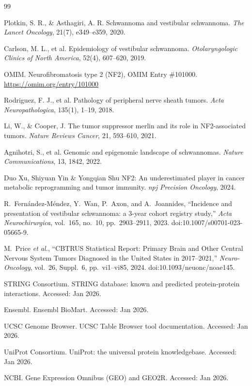 \documentclass[11pt]{article}
\begin{document}
	
	\begin{thebibliography}{99}
		
	Plotkin, S. R., \& Asthagiri, A. R.
	\newblock Schwannoma and vestibular schwannoma.
	\newblock \emph{The Lancet Oncology}, 21(7), e349--e359, 2020.
	
	Carlson, M. L., et al.
	\newblock Epidemiology of vestibular schwannoma.
	\newblock \emph{Otolaryngologic Clinics of North America}, 52(4), 607--620, 2019.
	
	OMIM.
	\newblock Neurofibromatosis type 2 (NF2), OMIM Entry \#101000.
	\newblock \url{https://omim.org/entry/101000}
	
	Rodriguez, F. J., et al.
	\newblock Pathology of peripheral nerve sheath tumors.
	\newblock \emph{Acta Neuropathologica}, 135(1), 1--19, 2018.
	
	Li, W., \& Cooper, J.
	\newblock The tumor suppressor merlin and its role in NF2-associated tumors.
	\newblock \emph{Nature Reviews Cancer}, 21, 593--610, 2021.
	
	Agnihotri, S., et al.
	\newblock Genomic and epigenomic landscape of schwannomas.
	\newblock \emph{Nature Communications}, 13, 1842, 2022.
	
	Duo Xu, Shiyuan Yin \& Yongqian Shu
	\newblock NF2: An underestimated player in cancer metabolic reprogramming and tumor immunity.
	\newblock \emph{npj Precision Oncology}, 2024.
	
	R.~Fernández-Méndez, Y.~Wan, P.~Axon, and A.~Joannides,
	``Incidence and presentation of vestibular schwannoma: a 3-year cohort registry study,''
	\emph{Acta Neurochirurgica}, vol.~165, no.~10, pp.~2903--2911, 2023.
	doi:10.1007/s00701-023-05665-9.
	
	M.~Price \emph{et al.},
	``CBTRUS Statistical Report: Primary Brain and Other Central Nervous System Tumors Diagnosed in the United States in 2017--2021,''
	\emph{Neuro-Oncology}, vol.~26, Suppl.~6, pp.~vi1--vi85, 2024.
	doi:10.1093/neuonc/noae145.
		
	STRING Consortium.
	\newblock STRING database: known and predicted protein-protein interactions.
	\newblock Accessed: Jan 2026.
	
	Ensembl.
	\newblock Ensembl BioMart.
	\newblock Accessed: Jan 2026.
	
	UCSC Genome Browser.
	\newblock UCSC Table Browser tool documentation.
	\newblock Accessed: Jan 2026.
	
	UniProt Consortium.
	\newblock UniProt: the universal protein knowledgebase.
	\newblock Accessed: Jan 2026.
	
	NCBI.
	\newblock Gene Expression Omnibus (GEO) and GEO2R.
	\newblock Accessed: Jan 2026.
		
	\end{thebibliography}
	
\end{document}
